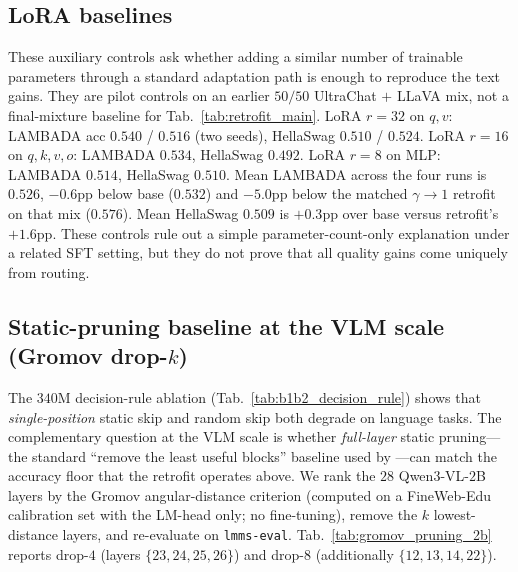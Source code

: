\documentclass{article}
\begin{document}
\subsection{LoRA baselines}
\label{app:lora_baselines}
These auxiliary controls ask whether adding a similar number of trainable parameters through a standard adaptation path is enough to reproduce the text gains. They are pilot controls on an earlier $50/50$ UltraChat $+$ LLaVA mix, not a final-mixture baseline for Tab.~\ref{tab:retrofit_main}. LoRA $r{=}32$ on $q,v$: LAMBADA acc $0.540$ / $0.516$ (two seeds), HellaSwag $0.510$ / $0.524$. LoRA $r{=}16$ on $q,k,v,o$: LAMBADA $0.534$, HellaSwag $0.492$. LoRA $r{=}8$ on MLP: LAMBADA $0.514$, HellaSwag $0.510$. Mean LAMBADA across the four runs is $0.526$, $-0.6$pp below base ($0.532$) and $-5.0$pp below the matched $\gamma{\to}1$ retrofit on that mix ($0.576$). Mean HellaSwag $0.509$ is $+0.3$pp over base versus retrofit's $+1.6$pp. These controls rule out a simple parameter-count-only explanation under a related SFT setting, but they do not prove that all quality gains come uniquely from routing.

\subsection{\texorpdfstring{Static-pruning baseline at the VLM scale (Gromov drop-$k$)}{Static-pruning baseline at the VLM scale (Gromov drop-k)}}
\label{app:gromov_pruning}
The $340$M decision-rule ablation (Tab.~\ref{tab:b1b2_decision_rule})
shows that \emph{single-position} static skip and random skip both
degrade on language tasks. The complementary question at the VLM
scale is whether \emph{full-layer} static pruning---the standard
``remove the least useful blocks'' baseline used by
\citet{gromov2024unreasonable}---can match the accuracy floor that the
retrofit operates above. We rank the $28$ Qwen$3$-VL-$2$B layers by
the Gromov angular-distance criterion (computed on a
FineWeb-Edu calibration set with the LM-head only; no fine-tuning),
remove the $k$ lowest-distance layers, and re-evaluate on
\texttt{lmms-eval}. Tab.~\ref{tab:gromov_pruning_2b} reports drop-$4$
(layers $\{23,24,25,26\}$) and drop-$8$ (additionally
$\{12,13,14,22\}$).
\end{document}
